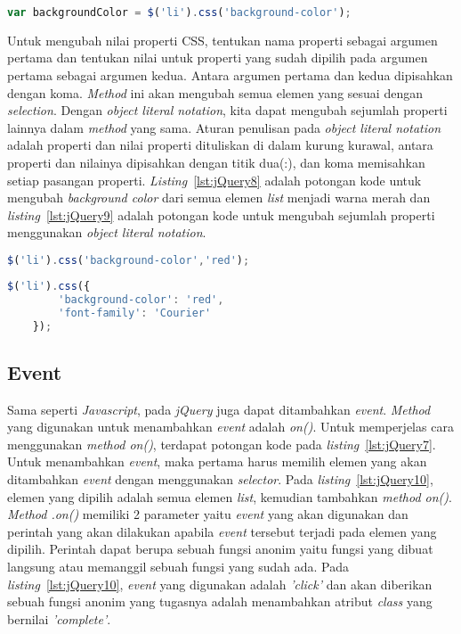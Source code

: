 \begin{lstlisting}[language=Javascript, caption=Mendapatkan nilai warna \textit{background color} dari elemen \textit{list} pertama, label={lst:jQuery7}]
	var backgroundColor = $('li').css('background-color');
\end{lstlisting}

Untuk mengubah nilai properti CSS, tentukan nama properti sebagai argumen pertama dan tentukan nilai untuk properti yang sudah dipilih pada argumen pertama sebagai argumen kedua. Antara argumen pertama dan kedua dipisahkan dengan koma. \textit{Method} ini akan mengubah semua elemen yang sesuai dengan \textit{selection}. Dengan \textit{object literal notation}, kita dapat mengubah sejumlah properti lainnya dalam \textit{method} yang sama. Aturan penulisan pada \textit{object literal notation} adalah properti dan nilai properti dituliskan di dalam kurung kurawal, antara properti dan nilainya dipisahkan dengan titik dua(:), dan koma memisahkan setiap pasangan properti. \textit{Listing}~\ref{lst:jQuery8} adalah potongan kode untuk mengubah \textit{background color} dari semua elemen \textit{list} menjadi warna merah dan \textit{listing}~\ref{lst:jQuery9} adalah potongan kode untuk  mengubah sejumlah properti menggunakan \textit{object literal notation}.

\begin{lstlisting}[language=Javascript, caption=Mengubah warna background color semua elemen list, label={lst:jQuery8}]
	$('li').css('background-color','red');
\end{lstlisting}

\begin{lstlisting}[language=Javascript, caption=Mengubah warna background color dan jenis font untuk semua elemen list menggunakan \textit{object literal notation}, label={lst:jQuery9}]
	$('li').css({
		'background-color': 'red',
		'font-family': 'Courier'
	});
\end{lstlisting}

\subsection{Event}
Sama seperti \textit{Javascript}, pada \textit{jQuery} juga dapat ditambahkan \textit{event}. \textit{Method} yang digunakan untuk menambahkan \textit{event} adalah \textit{on()}. Untuk memperjelas cara menggunakan \textit{method on()}, terdapat potongan kode pada \textit{listing}~\ref{lst:jQuery7}. Untuk menambahkan \textit{event}, maka pertama harus memilih elemen yang akan ditambahkan \textit{event} dengan menggunakan \textit{selector}. Pada \textit{listing}~\ref{lst:jQuery10}, elemen yang dipilih adalah semua elemen \textit{list}, kemudian tambahkan \textit{method on()}. \textit{Method .on()} memiliki 2 parameter yaitu \textit{event} yang akan digunakan dan perintah yang akan dilakukan apabila \textit{event} tersebut terjadi pada elemen yang dipilih. Perintah dapat berupa sebuah fungsi anonim yaitu fungsi yang dibuat langsung atau memanggil sebuah fungsi yang sudah ada. Pada \textit{listing}~\ref{lst:jQuery10}, \textit{event} yang digunakan adalah \textit{'click'} dan akan diberikan sebuah fungsi anonim yang tugasnya adalah menambahkan atribut \textit{class} yang bernilai \textit{'complete'}. 

